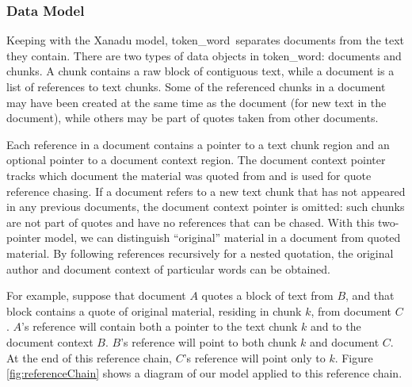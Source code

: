 \documentclass{acm_proc_article-sp}
\newcommand{\tw}{token\_word}
\begin{document}
\subsubsection{Data Model}
Keeping with the Xanadu model, \tw \  separates documents from the text they contain.
There are two types of data objects in \tw:  documents and chunks.
A chunk contains a raw block of contiguous text, while a document is a list of references to text chunks.
Some of the referenced chunks in a document may have been created at the same time as the document (for new text in the document), while others may be part of quotes taken from other documents.

Each reference in a document contains a pointer to a text chunk region and an optional pointer to a document context region.
The document context pointer tracks which document the material was quoted from and is used for quote reference chasing.
If a document refers to a new text chunk that has not appeared in any previous documents, the document context pointer is omitted:  such chunks are not part of quotes and have no references that can be chased.
With this two-pointer model, we can distinguish ``original'' material in a document from quoted material.  %
By following references recursively for a nested quotation, the original author and document context of particular words can be obtained.

For example, suppose that document $A$ quotes a block of text from $B$, and that block contains a quote of original material, residing in chunk $k$, from document $C$.  
$A$'s reference will contain both a pointer to the text chunk $k$ and to the document context $B$.  
$B$'s reference will point to both chunk $k$ and document $C$.  
At the end of this reference chain, $C$'s reference will point only to $k$.
Figure \ref{fig:referenceChain} shows a diagram of our model applied to this reference chain.
\end{document}
